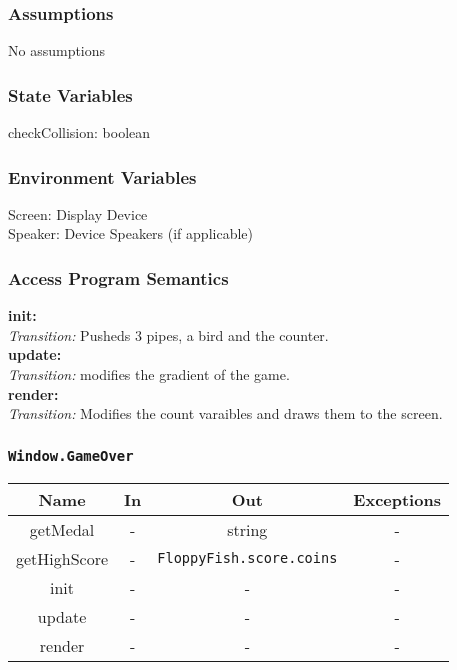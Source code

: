 \documentclass[11pt, oneside]{article}   	%
\begin{document}
\subsubsection{Assumptions}
No assumptions

\subsubsection{State Variables}
checkCollision: boolean\\



\subsubsection{Environment Variables}
Screen: Display Device\\
Speaker: Device Speakers (if applicable)\\

\subsubsection{Access Program Semantics} 
 \textbf{init:}  \\
 \textit{Transition:} Pusheds 3 pipes, a bird and the counter.\\
 \textbf{update:}  \\
 \textit{Transition:} modifies the gradient of the game.\\
 \textbf{render:}  \\
 \textit{Transition:} Modifies the count varaibles and draws them to the screen.\\


\subsubsection{\texttt{Window.GameOver}}



\begin{center}
\begin{tabular}{ |c|c|c|c| } 
 \hline
 Name & In & Out & Exceptions \\ 
 \hline \hline
 getMedal & - & string & - \\ 
 getHighScore & - & \texttt{FloppyFish.score.coins} & - \\ 
 init & - & - & - \\ 
 update & - & - & - \\ 
 render & - & - & - \\ 

 \hline
\end{tabular}
\end{center}
\end{document}
